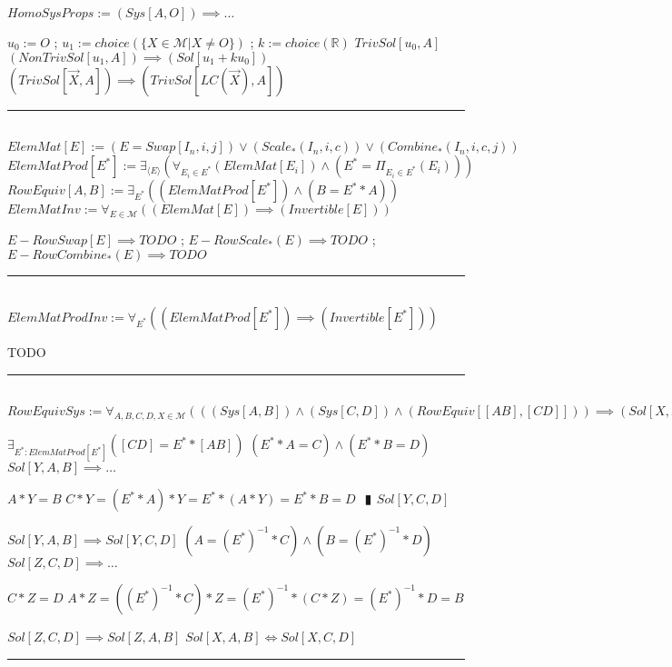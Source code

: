 \documentclass{book}
\newcommand{\abr}{:=}
\newcommand{\pipe}{$\phantom{(}\vrectangleblack\phantom{)}$}
\newcommand{\pr}[1]{\left(#1\right)}
\begin{document}
$HomoSysProps \abr (Sys[A, O]) \implies \ldots$
\begin{enumerate}
  \lit $u_0 \abr O$ ; $u_1 \abr choice(\{X \in \mathcal{M} | X \neq O\})$ ; $k \abr choice(\mathbb{R})$
  \lit $TrivSol[u_0, A]$
  \lit $(NonTrivSol[u_1, A]) \implies (Sol[u_1 + k u_0])$
  \lit $(TrivSol[\overrightarrow{X}, A]) \implies \pr{TrivSol[LC(\overrightarrow{X}), A]}$
\end{enumerate} \vspace{.75mm} \hrule \vspace{.75mm} \ \\ 

$ElemMat[E] \abr (E = Swap[I_n, i, j]) \lor \pr{Scale_*(I_n, i, c)} \lor \pr{Combine_*(I_n, i, c, j)}$ \\
$ElemMatProd[E^*] \abr \exists_{\langle E \rangle}\pr{\forall_{E_i \in E^*}(ElemMat[E_i]) \land \pr{E^* = \Pi_{E_i \in E^*}(E_i)}}$ \\
$RowEquiv[A, B] \abr \exists_{E^*}\pr{(ElemMatProd[E^*]) \land (B = E^* * A)}$ \\

$ElemMatInv \abr \forall_{E \in \mathcal{M}}\pr{(ElemMat[E]) \implies (Invertible[E])}$
\begin{enumerate}
  \lit $E-RowSwap[E] \implies TODO$ ; $E-RowScale_*(E) \implies TODO$ ; $E-RowCombine_*(E) \implies TODO$
\end{enumerate} \vspace{.75mm} \hrule \vspace{.75mm} \ \\ 

$ElemMatProdInv \abr \forall_{E^*}\pr{(ElemMatProd[E^*]) \implies (Invertible[E^*])}$
\begin{enumerate}
  \lit TODO
\end{enumerate} \vspace{.75mm} \hrule \vspace{.75mm} \ \\ 

$RowEquivSys \abr \forall_{A, B, C, D, X \in \mathcal{M}}\pr{\pr{(Sys[A, B]) \land (Sys[C, D]) \land (RowEquiv[[A B], [C D]])} \implies (Sol[X, A, B] \iff Sol[X, C, D])}$
\begin{enumerate}
  \lit $\exists_{E^* : ElemMatProd[E^*]}([C D] = E^* * [A B])$
  \lit $(E^* * A = C) \land (E^* * B = D)$
  \lit $Sol[Y, A, B] \implies \ldots$
  \begin{enumerate}
    \lit $A * Y = B$
    \lit $C * Y = (E^* * A) * Y = E^* * (A * Y) = E^* * B = D$ \pipe $Sol[Y, C, D]$
  \end{enumerate}
  \lit $Sol[Y, A, B] \implies Sol[Y, C, D]$
  \lit $\pr{A = (E^*)^{-1} * C} \land \pr{B = (E^*)^{-1} * D}$
  \lit $Sol[Z, C, D] \implies \ldots$
  \begin{enumerate}
    \lit $C * Z = D$
    \lit $A * Z = \pr{(E^*)^{-1} * C} * Z = (E^*)^{-1} * (C * Z) = (E^*)^{-1} * D = B$
  \end{enumerate}
  \lit $Sol[Z, C, D] \implies Sol[Z, A, B]$
  \lit $Sol[X, A, B] \iff Sol[X, C, D]$
\end{enumerate} \vspace{.75mm} \hrule \vspace{.75mm} \ \\ 
\end{document}
